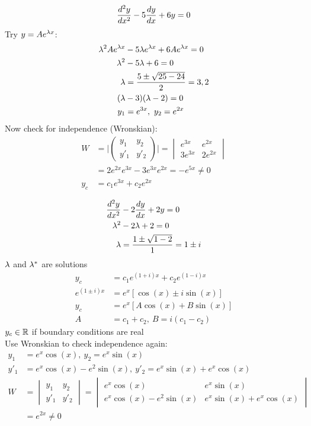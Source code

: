 \documentclass[Maths.tex]{subfiles}
\begin{document}
\begin{example}
\begin{align*}
    \frac{d^2 y}{dx^2} - 5\frac{dy}{dx} + 6y = 0
\end{align*}
Try $y = Ae^{\lambda x}$:
\begin{align*}
    \lambda^2 Ae^{\lambda x} &- 5\lambda e^{\lambda x} + 6Ae^{\lambda x} = 0 \\
    \lambda^2 &- 5\lambda + 6 = 0 \\
    \lambda &= \frac{5 \pm \sqrt{25 - 24}}{2} = 3,2 \\
    (\lambda &- 3)(\lambda - 2) = 0 \\
    y_1 &= e^{3x},~ y_2 = e^{2x}
\end{align*}
Now check for independence (Wronskian):
\begin{align*}
    W &= \Bigg|\begin{pmatrix} y_1 & y_2 \\ y'_1 & y'_2 \end{pmatrix}\Bigg| = \begin{vmatrix} e^{3x} & e^{2x} \\ 3e^{3x} & 2e^{2x} \end{vmatrix} \\
    &= 2e^{2x}e^{3x} - 3e^{3x}e^{2x} = -e^{5x} \neq 0 \\
    y_c &= c_1 e^{3x} + c_2 e^{2x}
\end{align*}
\end{example}

\begin{example}
\begin{align*}
    \frac{d^2 y}{dx^2} &- 2\frac{dy}{dx} + 2y = 0 \\
    \lambda^2 &- 2\lambda + 2 = 0 \\
    \lambda &= \frac{1 \pm \sqrt{1 - 2}}{1} = 1 \pm i
\end{align*}
$\lambda$ and $\lambda^*$ are solutions
\begin{align*}
    y_c &= c_1 e^{(1 + i)x} + c_2 e^{(1 - i)x} \\
    e^{(1 \pm i)x} &= e^x [\cos(x) \pm i\sin(x)] \\
    y_c &= e^x [A\cos(x) + B\sin(x)] \\
    A &= c_1 + c_2, ~ B = i(c_1 - c_2)
\end{align*}
$y_c \in \mathbb{R}$ if boundary conditions are real \\
Use Wronskian to check independence again:
\begin{align*}
    y_1 &= e^x \cos(x), ~ y_2 = e^x \sin(x) \\
    y'_1 &= e^x\cos(x) - e^2\sin(x), ~ y'_2 = e^x\sin(x) + e^x\cos(x) \\
    W &= \begin{vmatrix} y_1 & y_2 \\ y'_1 & y'_2 \end{vmatrix} = \begin{vmatrix} e^x \cos(x) & e^x \sin(x) \\ e^x\cos(x) - e^2\sin(x) & e^x\sin(x) + e^x\cos(x) \end{vmatrix} \\
    &= e^{2x} \neq 0
\end{align*}
\end{example}
\end{document}
